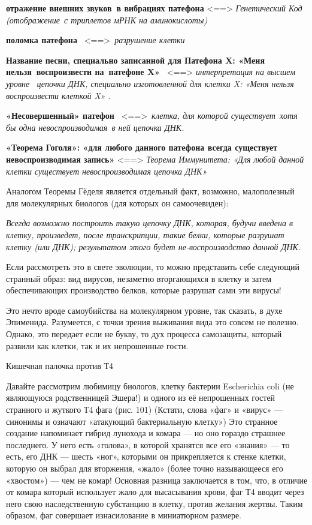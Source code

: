 \documentclass[../main.tex]{subfiles}
\begin{document}
\textbf{отражение внешних звуков~в вибрациях патефона} \textless==\textgreater{} \emph{Генетический Код (отображение~с триплетов мРНК на аминокислоты)}

\textbf{поломка патефона} ~\textless==\textgreater~\emph{разрушение клетки}

\textbf{Название песни, специально записанной для Патефона X: «Меня нельзя~воспроизвести на~патефоне X»} ~\textless==\textgreater{} \emph{интерпретация на высшем уровне ~цепочки ДНК, специально изготовленной для клетки X: «Меня нельзя воспроизвести клеткой X»} .

\textbf{«Несовершенный» патефон} ~\textless==\textgreater~\emph{клетка, для которой существует~хотя бы одна невоспроизводимая~в ней цепочка ДНК.}

\textbf{«Теорема Гоголя»: «для любого данного патефона всегда существует невоспроизводимая запись»} \textless==\textgreater{} \emph{Теорема Иммунитета: «Для любой данной клетки существует невоспроизводимая цепочка ДНК»}

Аналогом Теоремы Гёделя является отдельный факт, возможно, малополезный для молекулярных биологов (для которых он самоочевиден):

\emph{Всегда возможно построить такую цепочку ДНК, которая, будучи введена в клетку, произведет, после транскрипции, такие белки, которые разрушат клетку (или ДНК); результатом этого будет не-воспроизводство данной ДНК.}

Если рассмотреть это в свете эволюции, то можно представить себе следующий странный образ: вид вирусов, незаметно вторгающихся в клетку и затем обеспечивающих производство белков, которые разрушат сами эти вирусы!

Это нечто вроде самоубийства на молекулярном уровне, так сказать, в духе Эпименида. Разумеется, с точки зрения выживания вида это совсем не полезно. Однако, это передает если не букву, то дух процесса самозащиты, который развили как клетки, так и их непрошенные гости.

Кишечная палочка против Т4

Давайте рассмотрим любимицу биологов, клетку бактерии Escherichia coli (не являющуюся родственницей Эшера!) и одного из её непрошенных гостей странного и жуткого Т4 фага (рис. 101) (Кстати, слова «фаг» и «вирус» --- синонимы и означают «атакующий бактериальную клетку») Это странное создание напоминает гибрид лунохода и комара --- но оно гораздо страшнее последнего. У него есть «голова», в которой хранятся все его «знания» --- то есть, его ДНК --- шесть «ног», которыми он прикрепляется к стенке клетки, которую он выбрал для вторжения, «жало» (более точно называющееся его «хвостом») --- чем не комар! Основная разница заключается в том, что, в отличие от комара который использует жало для высасывания крови, фаг Т4 вводит через него свою наследственную субстанцию в клетку, против желания жертвы. Таким образом, фаг совершает изнасилование в миниатюрном размере.
\end{document}
